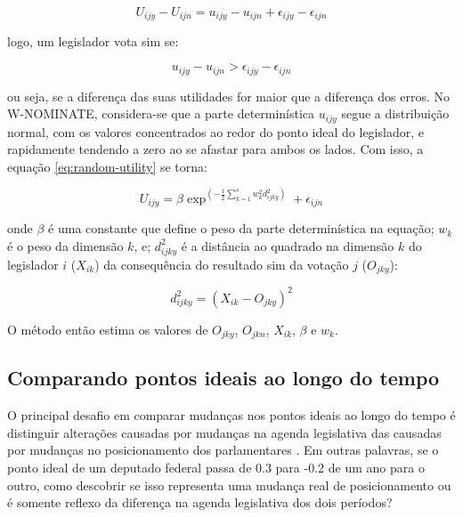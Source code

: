 \documentclass[a4paper,titlepage]{ppgi}\usepackage[]{graphicx}\usepackage[]{color}
\begin{document}
\begin{equation}
U_{ijy} - U_{ijn} = u_{ijy} - u_{ijn} + \epsilon_{ijy} - \epsilon_{ijn}
\end{equation}

logo, um legislador vota sim se:

\begin{equation}
u_{ijy} - u_{ijn} > \epsilon_{ijy} - \epsilon_{ijn}
\end{equation}

ou seja, se a diferença das suas utilidades for maior que a diferença dos
erros. No W-NOMINATE, considera-se que a parte determinística $u_{ijy}$ segue a
distribuição normal, com os valores concentrados ao redor do ponto ideal do
legislador, e rapidamente tendendo a zero ao se afastar para ambos os lados.
Com isso, a equação \ref{eq:random-utility} se torna:

\begin{equation}
  U_{ijy} = \beta \exp^{\left( - \frac{1}{2} \sum\limits_{k=1}^s w_k^2 d_{ijky}^2 \right)} + \epsilon_{ijn}
\end{equation}

onde $\beta$ é uma constante que define o peso da parte determinística na
equação; $w_k$ é o peso da dimensão $k$, e; $d_{ijky}^2$ é a distância ao
quadrado na dimensão $k$ do legislador $i$ ($X_{ik}$) da consequência do
resultado sim da votação $j$ ($O_{jky}$):

\begin{equation}
d_{ijky}^2 = \left(X_{ik} - O_{jky}\right)^2
\end{equation}

O método então estima os valores de $O_{jky}$, $O_{jkn}$, $X_{ik}$, $\beta$ e
$w_k$.


\subsection{Comparando pontos ideais ao longo do tempo}
\label{cap:fundamentacao:comparando-pontos-ideais-no-tempo}

O principal desafio em comparar mudanças nos pontos ideais ao longo do tempo é
distinguir alterações causadas por mudanças na agenda legislativa das causadas
por mudanças no posicionamento dos parlamentares \cite{Bailey2007}. Em outras
palavras, se o ponto ideal de um deputado federal passa de 0.3 para -0.2 de um ano
para o outro, como descobrir se isso representa uma mudança real de
posicionamento ou é somente reflexo da diferença na agenda legislativa dos dois
períodos?
\end{document}
